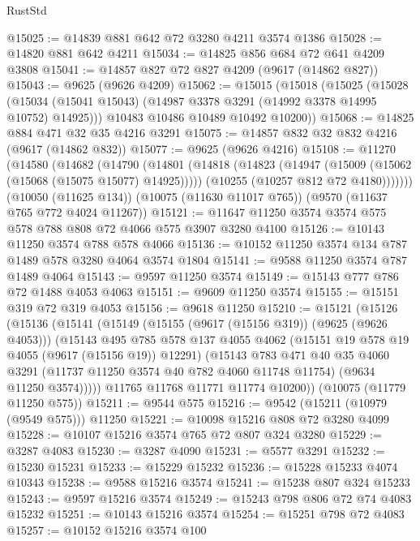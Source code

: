 \begin{lexlean}{RustStd}
\begin{coremodule}
@15025 := @14839 @881 @642 @72 @3280 @4211 @3574 @1386
@15028 := @14820 @881 @642 @4211
@15034 := @14825 @856 @684 @72 @641 @4209 @3808
@15041 := @14857 @827 @72 @827 @4209 (@9617 (@14862 @827))
@15043 := @9625 (@9626 @4209)
@15062 := @15015
    (@15018
      (@15025
        (@15028 (@15034 (@15041 @15043) (@14987 @3378 @3291 (@14992 @3378 @14995 @10752) @14925)))
        @10483
        @10486
        @10489
        @10492
        @10200))
@15068 := @14825 @884 @471 @32 @35 @4216 @3291
@15075 := @14857 @832 @32 @832 @4216 (@9617 (@14862 @832))
@15077 := @9625 (@9626 @4216)
@15108 := @11270
    (@14580
      (@14682
        (@14790
          (@14801
            (@14818
              (@14823 (@14947 (@15009 (@15062 (@15068 (@15075 @15077) @14925)))))
              (@10255 (@10257 @812 @72 @4180)))))))
    (@10050 (@11625 @134))
    (@10075 (@11630 @11017 @765))
    (@9570 (@11637 @765 @772 @4024 @11267))
@15121 := @11647 @11250 @3574 @3574 @575 @578 @788 @808 @72 @4066 @575 @3907 @3280 @4100
@15126 := @10143 @11250 @3574 @788 @578 @4066
@15136 := @10152 @11250 @3574 @134 @787 @1489 @578 @3280 @4064 @3574 @1804
@15141 := @9588 @11250 @3574 @787 @1489 @4064
@15143 := @9597 @11250 @3574
@15149 := @15143 @777 @786 @72 @1488 @4053 @4063
@15151 := @9609 @11250 @3574
@15155 := @15151 @319 @72 @319 @4053
@15156 := @9618 @11250
@15210 := @15121
    (@15126
      (@15136
        (@15141
          (@15149
            (@15155 (@9617 (@15156 @319)) (@9625 (@9626 @4053)))
            (@15143
              @495
              @785
              @578
              @137
              @4055
              @4062
              (@15151 @19 @578 @19 @4055 (@9617 (@15156 @19)) @12291)
              (@15143
                @783
                @471
                @40
                @35
                @4060
                @3291
                (@11737 @11250 @3574 @40 @782 @4060 @11748 @11754)
                (@9634 @11250 @3574)))))
        @11765
        @11768
        @11771
        @11774
        @10200))
    (@10075 (@11779 @11250 @575))
@15211 := @9544 @575
@15216 := @9542 (@15211 (@10979 (@9549 @575))) @11250
@15221 := @10098 @15216 @808 @72 @3280 @4099
@15228 := @10107 @15216 @3574 @765 @72 @807 @324 @3280
@15229 := @3287 @4083
@15230 := @3287 @4090
@15231 := @5577 @3291
@15232 := @15230 @15231
@15233 := @15229 @15232
@15236 := @15228 @15233 @4074 @10343
@15238 := @9588 @15216 @3574
@15241 := @15238 @807 @324 @15233
@15243 := @9597 @15216 @3574
@15249 := @15243 @798 @806 @72 @74 @4083 @15232
@15251 := @10143 @15216 @3574
@15254 := @15251 @798 @72 @4083
@15257 := @10152 @15216 @3574 @100

\end{coremodule}
\end{lexlean}
